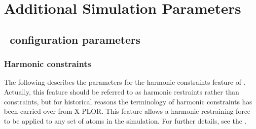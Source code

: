 \section{Additional Simulation Parameters}
\label{section:add}


\subsection{\NAMD\ configuration parameters}
\label{section:config_add}

\subsubsection{Harmonic constraints}

The following describes the parameters for the 
harmonic constraints feature of \NAMD.  Actually, this feature 
should be referred to as harmonic restraints rather than 
constraints, but for historical reasons the terminology of 
harmonic constraints has been carried over from X-PLOR.  
This feature allows a harmonic restraining force to be applied 
to any set of atoms in the simulation.  For further details, 
see the \PG.  

